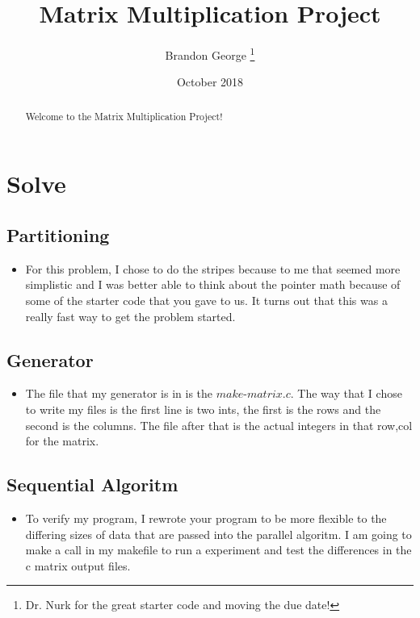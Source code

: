 \documentclass[12pt, letterpaper]{article}
\title{Matrix Multiplication Project}
\author{Brandon George \thanks{Dr. Nurk for the great starter code and moving the due date!}}
\date{October 2018}
\begin{document}
\begin{titlepage}
\maketitle
\end{titlepage}

\begin{abstract}
Welcome to the Matrix Multiplication Project!
\end{abstract}

\section{Solve}
\subsection{Partitioning}
\begin{itemize}
  \item For this problem, I chose to do the stripes because to me that seemed more simplistic and I was better able to think about the pointer math because of some of the starter code that you gave to us. It turns out that this was a really fast way to get the problem started.
\end{itemize}

\subsection{Generator}
\begin{itemize}
  \item The file that my generator is in is the $make$-$matrix.c$. The way that I chose to write my files is the first line is two ints, the first is the rows and the second is the columns. The file after that is the actual integers in that row,col for the matrix.
\end{itemize}

\subsection{Sequential Algoritm}
\begin{itemize}
  \item To verify my program, I rewrote your program to be more flexible to the differing sizes of data that are passed into the parallel algoritm. I am going to make a call in my makefile to run a experiment and test the differences in the c matrix output files.
\end{itemize}
\end{document}
